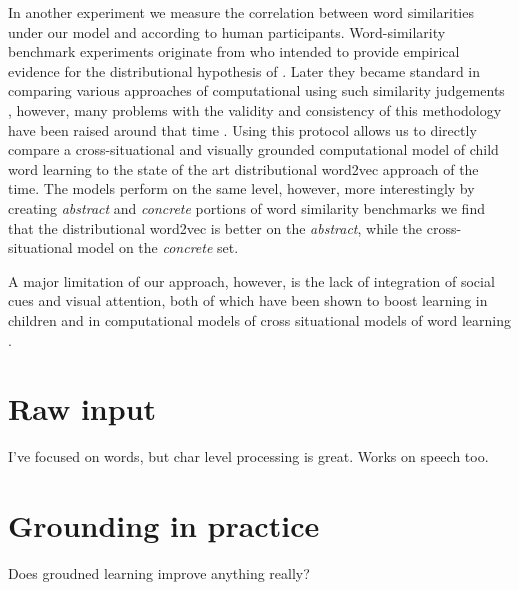 In another experiment we measure the
correlation between word similarities under our model and according to human participants.  
Word-similarity benchmark experiments originate from \citep{rubenstein1965contextual} who 
intended to provide empirical evidence for the distributional hypothesis of  \citep{harris1954distributional}.
Later they became standard in comparing various approaches of computational using such 
similarity judgements \citep{faruqui2014community}, however, many problems with the validity and
consistency of this methodology have been raised around that time \citep{faruqui2016problems}.
Using this protocol allows us to directly compare a cross-situational and visually grounded computational
model of child word learning to the state of the art distributional word2vec approach of the time. 
The models perform on the same level, however, more interestingly by creating
\emph{abstract} and  \emph{concrete} portions of word similarity benchmarks we find that
the distributional word2vec is better on the \emph{abstract}, while the cross-situational model on the 
\emph{concrete} set.   

A major limitation of our approach, however, is 
the lack of integration of social cues and visual attention, both of which 
have been shown to boost learning in children 
\citep{gleitman1990structural,tomasello1995two} and in computational models of cross situational
models of word learning \citep{yu2007unified,lazazaridou2016multimodal}.



\section{Raw input}
I've focused on words, but char level processing is great. Works on speech too.

\section{Grounding in practice}
Does groudned learning improve anything really?

